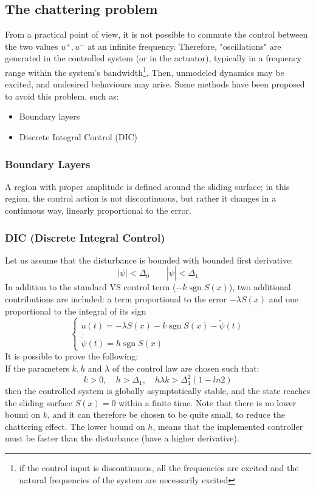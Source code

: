 \documentclass{book}
\DeclareMathOperator{\sgn}{sgn}
\begin{document}
\subsection{The chattering problem}
From a practical point of view, it is not possible to commute the control between the two values $u^+,u^-$ at an infinite frequency. Therefore, "oscillations" are generated in the controlled system (or in the actuator), typically in a frequency range within the system's bandwidth\footnote{if the control input is discontinuous, all the frequencies are excited and the natural frequencies of the system are necessarily excited}. Then, unmodeled dynamics may be excited, and undesired behaviours may arise. Some methods have been proposed to avoid this problem, such as:
\begin{itemize}
    \item Boundary layers
    \item Discrete Integral Control (DIC)
\end{itemize}
\subsubsection{Boundary Layers}
A region with proper amplitude is defined around the sliding surface; in this region, the control action is not discontinuous, but rather it changes in a continuous way, linearly proportional to the error.
\subsubsection{DIC (Discrete Integral Control)}
Let us assume that the disturbance is bounded with bounded first derivative:
\[
    |\psi|<\Delta_0 \qquad |\dot{\psi}|<\Delta_1
\]
In addition to the standard VS control term ($-k \sgn S(x)$), two additional contributions are included: a term proportional to the error $-\lambda S(x)$ and one proportional to the integral of its sign
\[
    \begin{cases}
        u(t) = -\lambda S(x) -k\sgn S(x)-\tilde{\psi}(t)\\
        \dot{\tilde{\psi}} (t) = h \sgn S(x)
    \end{cases}
\]
It is possible to prove the following: \\
If the parameters $k,h$ and $\lambda$ of the control law are chosen such that:
\[
    k>0, \quad h>\Delta_1, \quad h\lambda k > \Delta_1^2(1-ln2)
\]
then the controlled system is globally asymptotically stable, and the state reaches the sliding surface $S(x)=0$ within a finite time.
Note that there is no lower bound on $k$, and it can therefore be chosen to be quite small, to reduce the chattering effect. The lower bound on $h$, means that the implemented controller must be faster than the disturbance (have a higher derivative). 
\end{document}
